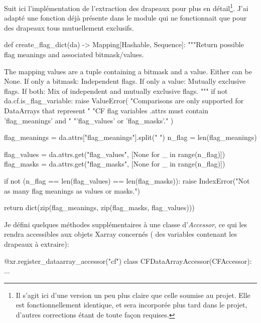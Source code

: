 Suit ici l'implémentation de l'extraction des drapeaux pour  plus en détail\footnote{Il s'agit ici d'une version un peu plus claire que celle soumise au projet. Elle est fonctionnellement identique, et sera incorporée plus tard dans le projet, d'autres corrections étant de toute façon requises.}.
J'ai adapté une fonction déjà présente dans le module qui ne fonctionnait que pour des drapeaux tous mutuellement exclusifs.
\begin{python}
def create_flag_dict(da) -> Mapping[Hashable, Sequence]:
    """Return possible flag meanings and associated bitmask/values.

    The mapping values are a tuple containing a bitmask and a value.
    Either can be None.
    If only a bitmask: Independent flags.
    If only a value: Mutually exclusive flags.
    If both: Mix of independent and mutually exclusive flags.
    """
    if not da.cf.is_flag_variable:
        raise ValueError(
            "Comparisons are only supported for DataArrays that represent "
            "CF flag variables .attrs must contain 'flag_meanings' and "
            "'flag_values' or 'flag_masks'."
        )

    flag_meanings = da.attrs["flag_meanings"].split(" ")
    n_flag = len(flag_meanings)

    flag_values = da.attrs.get("flag_values", [None for _ in range(n_flag)])
    flag_masks = da.attrs.get("flag_masks", [None for _ in range(n_flag)])

    if not (n_flag == len(flag_values) == len(flag_masks)):
        raise IndexError("Not as many flag meanings as values or masks.")

    return dict(zip(flag_meanings, zip(flag_masks, flag_values)))
\end{python}

Je défini quelques méthodes supplémentaires à une classe d'\emph{Accessor}, ce qui les rendra accessibles aux objets Xarray concernés ( des variables  contenant les drapeaux à extraire):
\begin{python}
@xr.register_dataarray_accessor("cf")
class CFDataArrayAccessor(CFAccessor):
    ...
\end{python}

